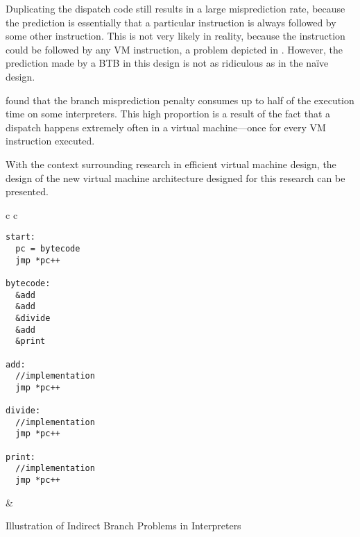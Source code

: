 		Duplicating the dispatch code still results in a large misprediction rate, because the prediction is essentially that a particular instruction is always followed by some other instruction. This is not very likely in reality, because the instruction could be followed by any VM instruction, a problem depicted in . However, the prediction made by a BTB in this design is not as ridiculous as in the naïve design.
		
		\cite{structureinterpreters} found that the branch misprediction penalty consumes up to half of the execution time on some interpreters. This high proportion is a result of the fact that a dispatch happens extremely often in a virtual machine---once for every VM instruction executed.
		
		With the context surrounding research in efficient virtual machine design, the design of the new virtual machine architecture designed for this research can be presented.
		
				\begin{myfigure}
					\begin{tabular}{c c}
						{
							\begin{lstlisting}
start:
  pc = bytecode
  jmp *pc++

bytecode:
  &add
  &add
  &divide
  &add
  &print

add:
  //implementation
  jmp *pc++

divide:
  //implementation
  jmp *pc++

print:
  //implementation
  jmp *pc++
							\end{lstlisting}
						} & 
						{
							\hspace{-9em}
						}
					\end{tabular}
					\caption{Illustration of Indirect Branch Problems in Interpreters}
					\label{fig:interpreterbtb}
				\end{myfigure}
		
